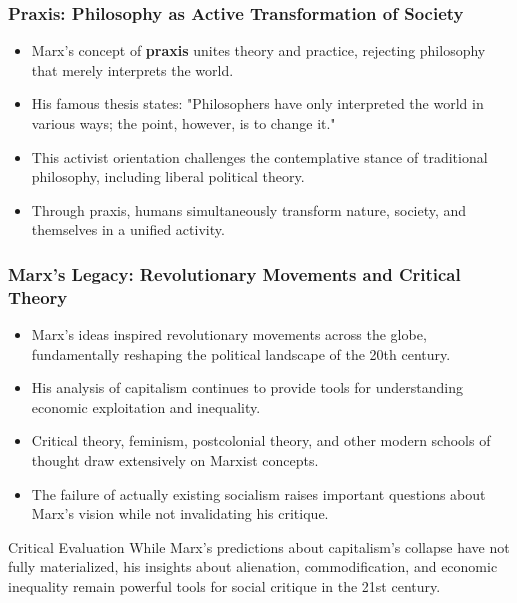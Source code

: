 \documentclass{beamer}
\begin{document}
\begin{frame}
\frametitle{Praxis: Philosophy as Active Transformation of Society}
\begin{itemize}
    \item Marx's concept of \textbf{praxis} unites theory and practice, rejecting philosophy that merely interprets the world.
    \item His famous thesis states: "Philosophers have only interpreted the world in various ways; the point, however, is to change it."
    \item This activist orientation challenges the contemplative stance of traditional philosophy, including liberal political theory.
    \item Through praxis, humans simultaneously transform nature, society, and themselves in a unified activity.
\end{itemize}

\begin{center}
\small
{}
\end{center}
\end{frame}

\begin{frame}
\frametitle{Marx's Legacy: Revolutionary Movements and Critical Theory}
\begin{itemize}
    \item Marx's ideas inspired revolutionary movements across the globe, fundamentally reshaping the political landscape of the 20th century.
    \item His analysis of capitalism continues to provide tools for understanding economic exploitation and inequality.
    \item Critical theory, feminism, postcolonial theory, and other modern schools of thought draw extensively on Marxist concepts.
    \item The failure of actually existing socialism raises important questions about Marx's vision while not invalidating his critique.
\end{itemize}

\begin{alertblock}{Critical Evaluation}
While Marx's predictions about capitalism's collapse have not fully materialized, his insights about alienation, commodification, and economic inequality remain powerful tools for social critique in the 21st century.
\end{alertblock}
\end{frame}
\end{document}

